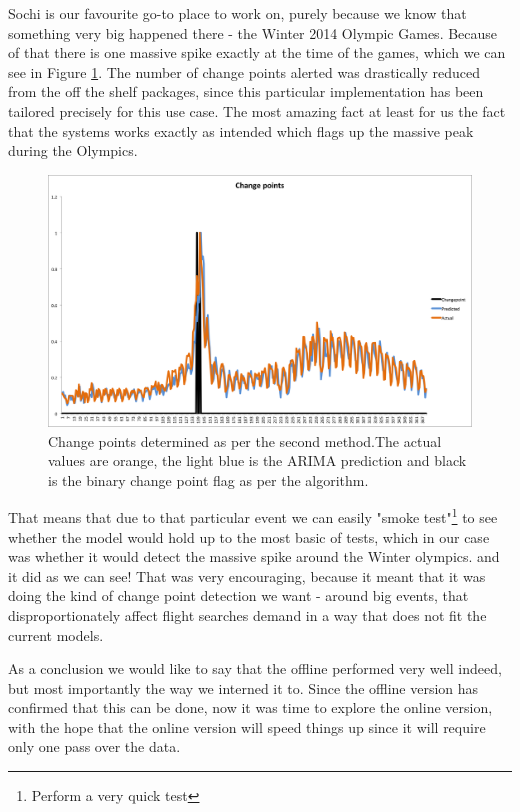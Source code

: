 \documentclass[minf,twoside,singlespacing,parskip,frontabs,notimes,12pt]{infthesis} %
\begin{document}
Sochi is our favourite go-to place to work on, purely because we know that something very big happened there - the Winter 2014 Olympic Games. Because of that there is one massive spike exactly at the time of the games, which we can see in Figure \ref{offline-method}. The number of change points alerted was drastically reduced from the off the shelf packages, since this particular implementation has been tailored precisely for this use case. The most amazing fact at least for us the fact that the systems works exactly as intended which flags up the massive peak during the Olympics. 

\begin{figure}[h!]
\begin{center}
\includegraphics[width=\textwidth]{Changepoint_99}
\end{center}
\caption{Change points determined as per the second method.The actual values are orange, the light blue is the ARIMA prediction and black is the binary change point flag as per the algorithm.}
\label{offline-method}
\end{figure}


That means that due to that particular event we can easily "smoke test"\footnote{Perform a very quick test} to see whether the model would hold up to the most basic of tests, which in our case was whether it would detect the massive spike around the Winter olympics. and it did as we can see! That was very encouraging, because it meant that it was doing the kind of change point detection we want - around big events, that disproportionately affect flight searches demand in a way that does not fit the current models. 

As a conclusion we would like to say that the offline performed very well indeed, but most importantly the way we interned it to. Since the offline version has confirmed that this can be done, now it was time to explore the online version, with the hope that the online version will speed things up since it will require only one pass over the data. 
\end{document}
